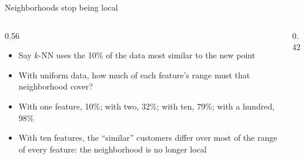 \begin{frame}{Neighborhoods stop being local}
    \begin{columns}[T]
        \begin{column}{0.56\textwidth}
            \begin{itemize}
                \item Say $k$-NN uses the 10\% of the data most similar to the new point
                \item With uniform data, how much of each feature's range must that neighborhood cover?
                \item With one feature, 10\%; with two, 32\%; with ten, 79\%; with a hundred, 98\%
                \item With ten features, the ``similar'' customers differ over most of the range of every feature: the neighborhood is no longer local
            \end{itemize}
        \end{column}
        \begin{column}{0.42\textwidth}
            \centering
        \end{column}
    \end{columns}
\end{frame}

